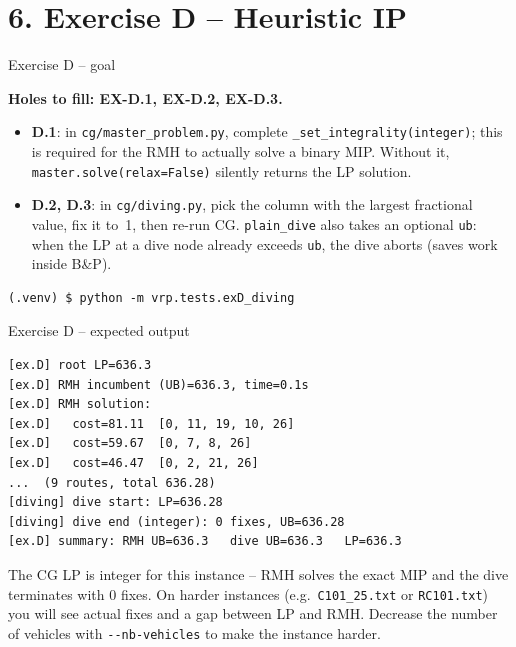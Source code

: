 \documentclass[10pt,aspectratio=169]{beamer}
\begin{document}
\section{6. Exercise D -- Heuristic IP}

\begin{frame}[fragile]{Exercise D -- goal}
  \begin{exbox}
    \textbf{Holes to fill: EX-D.1, EX-D.2, EX-D.3.}
    \begin{itemize}\small
      \item \textbf{D.1}: in \texttt{cg/master\_problem.py}, complete
            \texttt{\_set\_integrality(integer)}; \alert{this is required}
            for the RMH to actually solve a binary MIP. Without it,
            \texttt{master.solve(relax=False)} silently returns the LP
            solution.
      \item \textbf{D.2, D.3}: in \texttt{cg/diving.py}, pick the column
            with the largest fractional value, fix it to~1, then re-run CG.
            \texttt{plain\_dive} also takes an optional \texttt{ub}: when
            the LP at a dive node already exceeds \texttt{ub}, the dive
            aborts (saves work inside B\&P).
    \end{itemize}
  \end{exbox}
\begin{lstlisting}[style=sh]
(.venv) $ python -m vrp.tests.exD_diving
\end{lstlisting}
\end{frame}

\begin{frame}[fragile]{Exercise D -- expected output}
\begin{lstlisting}[style=sh,basicstyle=\ttfamily\scriptsize]
[ex.D] root LP=636.3
[ex.D] RMH incumbent (UB)=636.3, time=0.1s
[ex.D] RMH solution:
[ex.D]   cost=81.11  [0, 11, 19, 10, 26]
[ex.D]   cost=59.67  [0, 7, 8, 26]
[ex.D]   cost=46.47  [0, 2, 21, 26]
...  (9 routes, total 636.28)
[diving] dive start: LP=636.28
[diving] dive end (integer): 0 fixes, UB=636.28
[ex.D] summary: RMH UB=636.3   dive UB=636.3   LP=636.3
\end{lstlisting}
  \begin{tipbox}
    The CG LP is integer for this instance -- RMH solves the exact MIP and
    the dive terminates with 0 fixes.  On harder instances (e.g.\
    \texttt{C101\_25.txt} or \texttt{RC101.txt}) you will see actual fixes
    and a gap between LP and RMH. Decrease the number of vehicles with
    \texttt{{-}{-}nb-vehicles} to make the instance harder.
  \end{tipbox}
\end{frame}
\end{document}

